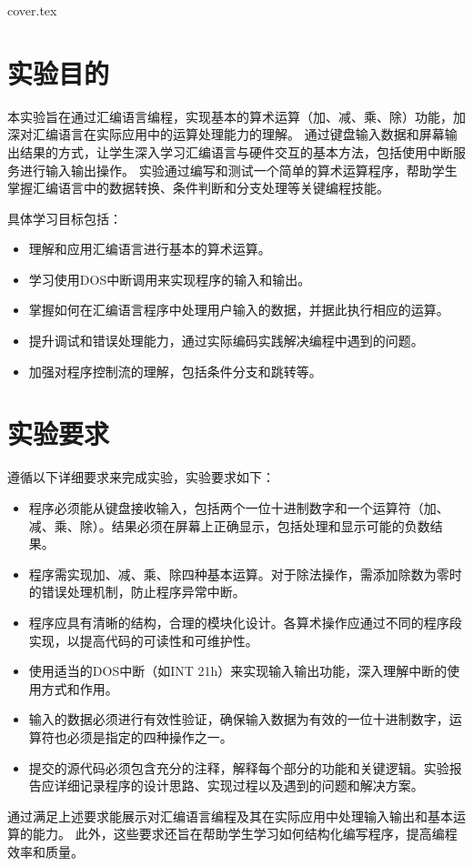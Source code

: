 \documentclass[12pt]{article}
\begin{document}
 {cover.tex}
\section{实验目的}
本实验旨在通过汇编语言编程，实现基本的算术运算（加、减、乘、除）功能，加深对汇编语言在实际应用中的运算处理能力的理解。
通过键盘输入数据和屏幕输出结果的方式，让学生深入学习汇编语言与硬件交互的基本方法，包括使用中断服务进行输入输出操作。
实验通过编写和测试一个简单的算术运算程序，帮助学生掌握汇编语言中的数据转换、条件判断和分支处理等关键编程技能。

具体学习目标包括：
\begin{itemize}
    \item 理解和应用汇编语言进行基本的算术运算。
    \item 学习使用DOS中断调用来实现程序的输入和输出。
    \item 掌握如何在汇编语言程序中处理用户输入的数据，并据此执行相应的运算。
    \item 提升调试和错误处理能力，通过实际编码实践解决编程中遇到的问题。
    \item 加强对程序控制流的理解，包括条件分支和跳转等。
\end{itemize}

\section{实验要求}
遵循以下详细要求来完成实验，实验要求如下：
\begin{itemize}
    \item 程序必须能从键盘接收输入，包括两个一位十进制数字和一个运算符（加、减、乘、除）。结果必须在屏幕上正确显示，包括处理和显示可能的负数结果。
    \item 程序需实现加、减、乘、除四种基本运算。对于除法操作，需添加除数为零时的错误处理机制，防止程序异常中断。
    \item 程序应具有清晰的结构，合理的模块化设计。各算术操作应通过不同的程序段实现，以提高代码的可读性和可维护性。
    \item 使用适当的DOS中断（如INT 21h）来实现输入输出功能，深入理解中断的使用方式和作用。
    \item 输入的数据必须进行有效性验证，确保输入数据为有效的一位十进制数字，运算符也必须是指定的四种操作之一。
    \item 提交的源代码必须包含充分的注释，解释每个部分的功能和关键逻辑。实验报告应详细记录程序的设计思路、实现过程以及遇到的问题和解决方案。
\end{itemize}

通过满足上述要求能展示对汇编语言编程及其在实际应用中处理输入输出和基本运算的能力。
此外，这些要求还旨在帮助学生学习如何结构化编写程序，提高编程效率和质量。
\end{document}
